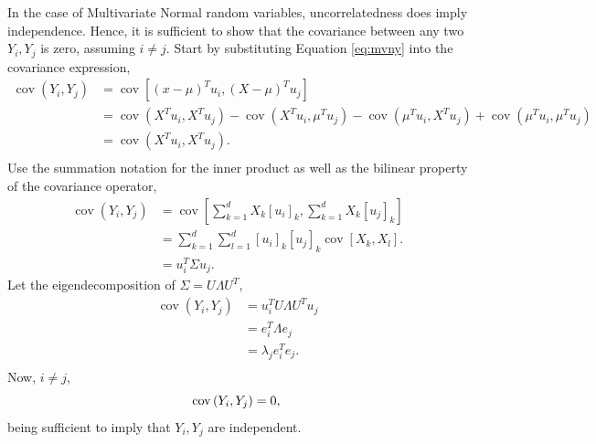 \documentclass{article}[12pt]
\begin{document}
\begin{enumerate}
	In the case of Multivariate Normal random variables, uncorrelatedness does imply independence. Hence, it is sufficient to show that the covariance between any two $Y_i, Y_j$ is zero, assuming $i \ne j$. Start by substituting Equation \ref{eq:mvny} into the covariance expression,
	\begin{equation}
		\begin{aligned}
			\operatorname{cov} \left( Y_i, Y_j \right) &= \operatorname{cov} \left[ \left( x - \mu \right)^T u_i, \left( X - \mu \right)^T u_j \right] \\
								   &= \operatorname{cov} \left( X^T u_i, X^T u_j \right) 
								   - \operatorname{cov} \left( X^T u_i, \mu^T u_j \right) - \operatorname{cov} \left( \mu^T u_i, X^T u_j \right) + \operatorname{cov} \left( \mu^T u_i, \mu^T u_j \right)\\
								   &= \operatorname{cov} \left( X^T u_i, X^T u_j \right).\\
		\end{aligned}
	\end{equation}
Use the summation notation for the inner product as well as the bilinear property of the covariance operator,
\begin{equation}
	\begin{aligned}
		\operatorname{cov} \left( Y_i, Y_j \right) &= \operatorname{cov} \left[ \sum^{d}_{k=1} X_k \left[ u_i \right]_k, \sum^{d}_{k=1} X_k \left[ u_j \right]_k   \right] \\
							   &= \sum^{d}_{k=1} \sum^{d}_{l=1} \left[ u_i \right]_k \left[ u_j \right]_k \operatorname{cov} \left[ X_k, X_l \right].\\  
							   &= u_i^T \Sigma u_j.
	\end{aligned}
\end{equation}
Let the eigendecomposition of $\Sigma = U \Lambda U^T$,
\begin{equation} \label{eq:sigdecomp}
	\begin{aligned}
		\operatorname{cov} \left( Y_i, Y_j \right)	&= u_i^T U \Lambda U^T u_j \\
								&= e_i^T \Lambda e_j \\
								&= \lambda_j e_i^T e_j. \\
	\end{aligned}
\end{equation}
Now, $i \ne j$,
\begin{equation}
	\operatorname{cov} \left( Y_i, Y_j \right) = 0,\\
\end{equation}
being sufficient to imply that $Y_i, Y_j$ are independent.


\end{enumerate}
\end{document}
